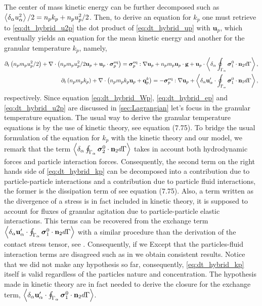 The center of mass kinetic energy can be further decomposed such as $\left<\delta_\alpha u_\alpha^2\right>/2 = n_p k_p + n_p u_p^2/2$. 
Then, to derive an equation for $k_p$ one must retrieve to \ref{eq:dt_hybrid_u2p} the dot product of \ref{eq:dt_hybrid_up} with $\textbf{u}_p$, which eventually yields an equation for the mean kinetic energy and another for the granular temperature $k_p$, namely,
\begin{align}
    \label{eq:dt_hybrid_up2}
\partial_t \left(n_p m_p u_p^2/ 2\right)
    + \mathbf{\nabla}\cdot \left(n_p
    m_p u_p^2/ 2 \textbf{u}_p 
    + \textbf{u}_p \cdot \bm{\sigma}_p^\text{eq}
    \right)
    = 
    \bm{\sigma}_p^\text{eq}  :\mathbf{\nabla} \textbf{u}_p
    +  n_p m_p \textbf{u}_p \cdot 
     \textbf{g}
    + \textbf{u}_p \cdot \left<\delta_\alpha \oint_{\Gamma_\alpha} {\bm{\sigma}_1^0 \cdot \textbf{n}_2} d\Gamma\right>,\\
    \label{eq:dt_hybrid_kp}
    \partial_t \left(n_p m_p k_p\right)
    + \mathbf{\nabla}\cdot \left(n_p
    m_p k_p \textbf{u}_p 
    + \textbf{q}^k_p
    \right)
    = 
    - \bm{\sigma}_p^\text{eq}  :\mathbf{\nabla} \textbf{u}_p
    + \left<\delta_\alpha \textbf{u}_\alpha'\cdot\oint_{\Gamma_\alpha} \bm{\sigma}_1^0 \cdot \textbf{n}_2 d\Gamma\right>,
\end{align}
respectively.
Since equation \ref{eq:dt_hybrid_Wp}, \ref{eq:dt_hybrid_ep} and \ref{eq:dt_hybrid_u2p} are discussed in \ref{sec:Lagrangian} let's focus in the granular temperature equation. 
The usual way to derive the granular temperature equations is by the use of kinetic theory, see \citet[Chapter 7 and 9]{rao2008introduction} equation (7.75). 
To bridge the usual formulation of the equation for $k_p$ with the kinetic theory and our model, we remark that the term $\left<\delta_\alpha \oint_{\Gamma_\alpha} \bm{\sigma}_2^0 \cdot \textbf{n}_2 d\Gamma\right>$ takes in account both hydrodynamic forces and particle interaction forces. 
Consequently, the second term on the right hands side of \ref{eq:dt_hybrid_kp} can be decomposed into a contribution due to particle-particle interactions and a contribution due to particle fluid interactions, the former is the dissipation term of see \citet[Chapter 7 and 9]{rao2008introduction} equation (7.75). 
Also, a term written as the divergence of a stress is in fact included in kinetic theory, it is supposed to account for fluxes of granular agitation due to particle-particle elastic interactions. 
This terms can be recovered from the exchange term $\left<\delta_\alpha \textbf{u}_\alpha'\cdot\oint_{\Gamma_\alpha} \bm{\sigma}_1^0 \cdot \textbf{n}_2 d\Gamma\right>$ with a similar procedure than the derivation of the contact stress tensor, see \citet{scorsim2021particle}. 
Consequently, if we Except that the particles-fluid interaction terms are disagreed such as in \citet{rao2008introduction} we obtain consistent results. 
Notice that we did not make any hypothesis so far, consequently, \ref{eq:dt_hybrid_kp} itself is valid regardless of the particles nature and concentration.
The hypothesis made in kinetic theory are in fact needed to derive the closure for the exchange term, $\left<\delta_\alpha \textbf{u}_\alpha'\cdot\oint_{\Gamma_\alpha} \bm{\sigma}_1^0 \cdot \textbf{n}_2 d\Gamma\right>$. 

